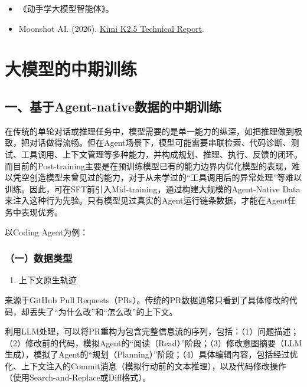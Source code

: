 \begin{itemize}
\tightlist
\item
  《动手学大模型智能体》。
\item
  Moonshot AI. (2026). \href{https://github.com/MoonshotAI/Kimi-K2.5/blob/master/tech_report.pdf}{Kimi K2.5 Technical Report}.
\end{itemize}

\clearpage

\hypertarget{ux5927ux6a21ux578bux7684ux4e2dux671fux8badux7ec3}{%
\section{大模型的中期训练}\label{ux5927ux6a21ux578bux7684ux4e2dux671fux8badux7ec3}}

\hypertarget{ux4e00ux57faux4e8eagent-nativeux6570ux636eux7684ux4e2dux671fux8badux7ec3}{%
\subsection{一、基于Agent-native数据的中期训练}\label{ux4e00ux57faux4e8eagent-nativeux6570ux636eux7684ux4e2dux671fux8badux7ec3}}

在传统的单轮对话或推理任务中，模型需要的是单一能力的纵深，如把推理做到极致，把对话做得流畅。但在Agent场景下，模型可能需要串联检索、代码诊断、测试、工具调用、上下文管理等多种能力，并构成规划、推理、执行、反馈的闭环。而目前的Post-training主要是在预训练模型已有的能力边界内优化模型的表现，难以凭空创造模型未曾见过的能力，对于从未学过的``工具调用后的异常处理''等难以训练。因此，可在SFT前引入Mid-training，通过构建大规模的Agent-Native Data来注入这种行为先验。只有模型见过真实的Agent运行链条数据，才能在Agent任务中表现优秀。

以Coding Agent为例：

\hypertarget{ux4e00ux6570ux636eux7c7bux578b}{%
\subsubsection{（一）数据类型}\label{ux4e00ux6570ux636eux7c7bux578b}}

\begin{enumerate}
\def\labelenumi{\arabic{enumi}.}
\tightlist
\item
  上下文原生轨迹
\end{enumerate}

来源于GitHub Pull Requests（PRs）。传统的PR数据通常只看到了具体修改的代码，却丢失了``为什么改''和``怎么改''的上下文。

利用LLM处理，可以将PR重构为包含完整信息流的序列，包括：（1）问题描述；（2）修改前的代码，模拟Agent的``阅读（Read）''阶段；（3）修改意图摘要（LLM生成），模拟了Agent的``规划（Planning）''阶段；（4）具体编辑内容，包括经过优化、上下文注入的Commit消息（模拟行动前的文本推理），以及代码修改操作（使用Search-and-Replace或Diff格式）。

